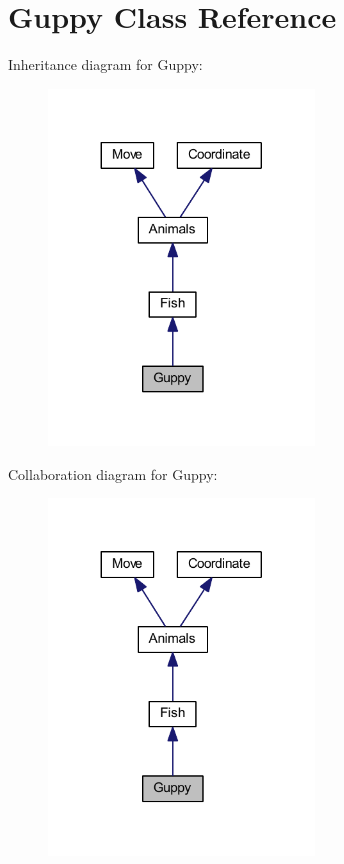 \hypertarget{class_guppy}{}\section{Guppy Class Reference}
\label{class_guppy}


Inheritance diagram for Guppy\+:
\nopagebreak
\begin{figure}[H]
\begin{center}
\leavevmode
\includegraphics[width=200pt]{class_guppy__inherit__graph}
\end{center}
\end{figure}


Collaboration diagram for Guppy\+:
\nopagebreak
\begin{figure}[H]
\begin{center}
\leavevmode
\includegraphics[width=200pt]{class_guppy__coll__graph}
\end{center}
\end{figure}
